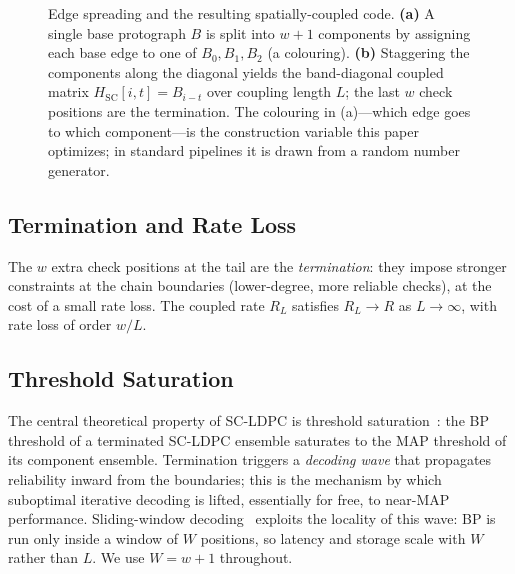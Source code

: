 \documentclass[journal]{IEEEtran}
\begin{document}
\begin{figure}[t]
\caption{Edge spreading and the resulting spatially-coupled code. \textbf{(a)} A
single base protograph $B$ is split into $w{+}1$ components by assigning each base
edge to one of $B_0,B_1,B_2$ (a colouring). \textbf{(b)} Staggering the components
along the diagonal yields the band-diagonal coupled matrix
$H_{\mathrm{SC}}[i,t]=B_{i-t}$ over coupling length $L$; the last $w$ check positions
are the termination. The colouring in (a)---which edge goes to which
component---is the construction variable this paper optimizes; in standard
pipelines it is drawn from a random number generator.}
\label{fig:scstruct}
\end{figure}

\subsection{Termination and Rate Loss}
The $w$ extra check positions at the tail are the \emph{termination}: they
impose stronger constraints at the chain boundaries (lower-degree, more reliable
checks), at the cost of a small rate loss. The coupled rate $R_L$ satisfies
$R_L \to R$ as $L \to \infty$, with rate loss of order $w/L$.

\subsection{Threshold Saturation}\label{sec:thr-sat}
The central theoretical property of SC-LDPC is threshold
saturation~\cite{kudekar2011threshold}: the BP threshold of a terminated
SC-LDPC ensemble saturates to the MAP threshold of its component ensemble.
Termination triggers a \emph{decoding wave} that propagates reliability inward
from the boundaries; this is the mechanism by which suboptimal iterative
decoding is lifted, essentially for free, to near-MAP performance. Sliding-window
decoding~\cite{iyengar2011windowed} exploits the locality of this wave: BP is run
only inside a window of $W$ positions, so latency and storage scale with $W$
rather than $L$. We use $W = w{+}1$ throughout.
\end{document}
